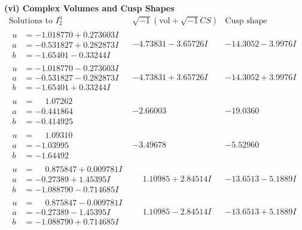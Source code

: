 \documentclass[1p]{elsarticle_modified}
\theoremstyle{definition}
\newcommand{\I}{\sqrt{-1}}
\begin{document}
\newpage\flushleft \textbf{(vi) Complex Volumes and Cusp Shapes}
$$\begin{array}{c|c|c}  
\text{Solutions to }I^u_{2}& \I (\text{vol} + \sqrt{-1}CS) & \text{Cusp shape}\\
 \hline 
\begin{aligned}
u &= -1.018770 + 0.273603 I \\
a &= -0.531827 + 0.282873 I \\
b &= -1.65401 - 0.33244 I\end{aligned}
 & -4.73831 - 3.65726 I & -14.3052 - 3.9976 I \\ \hline\begin{aligned}
u &= -1.018770 - 0.273603 I \\
a &= -0.531827 - 0.282873 I \\
b &= -1.65401 + 0.33244 I\end{aligned}
 & -4.73831 + 3.65726 I & -14.3052 + 3.9976 I \\ \hline\begin{aligned}
u &= \phantom{-}1.07262\phantom{ +0.000000I} \\
a &= -0.441864\phantom{ +0.000000I} \\
b &= -0.414925\phantom{ +0.000000I}\end{aligned}
 & -2.66003\phantom{ +0.000000I} & -19.0360\phantom{ +0.000000I} \\ \hline\begin{aligned}
u &= \phantom{-}1.09310\phantom{ +0.000000I} \\
a &= -1.03995\phantom{ +0.000000I} \\
b &= -1.64492\phantom{ +0.000000I}\end{aligned}
 & -3.49678\phantom{ +0.000000I} & -5.52960\phantom{ +0.000000I} \\ \hline\begin{aligned}
u &= \phantom{-}0.875847 + 0.009781 I \\
a &= -0.27389 + 1.45395 I \\
b &= -1.088790 - 0.714685 I\end{aligned}
 & \phantom{-}1.10985 + 2.84514 I & -13.6513 - 5.1889 I \\ \hline\begin{aligned}
u &= \phantom{-}0.875847 - 0.009781 I \\
a &= -0.27389 - 1.45395 I \\
b &= -1.088790 + 0.714685 I\end{aligned}
 & \phantom{-}1.10985 - 2.84514 I & -13.6513 + 5.1889 I \\ \hline\begin{aligned}

\end{aligned}
\end{array}$$
\end{document}
